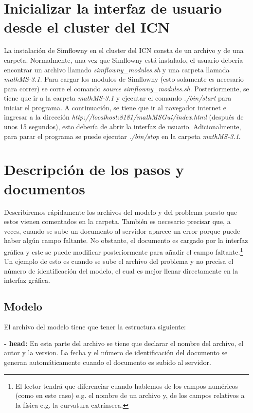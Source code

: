 \documentclass[11pt]{article}
\begin{document}
\section{Inicializar la interfaz de usuario desde el cluster del ICN}
La instalación de Simflowny en el cluster del ICN consta de un archivo y de una carpeta. Normalmente, una vez que Simflowny está instalado, el usuario debería encontrar un archivo llamado {\itshape simflowny\_modules.sh} y una carpeta llamada {\itshape mathMS-3.1}. Para cargar los modulos de Simflowny (esto solamente es necesario para correr) se corre el comando {\itshape source simflowny\_modules.sh}. Posteriormente, se tiene que ir a la carpeta {\itshape mathMS-3.1} y ejecutar el comando {\itshape ./bin/start} para iniciar el programa. A continuación, se tiene que ir al navegador internet e ingresar a la dirección {\itshape http://localhost:8181/mathMSGui/index.html} (después de unos 15 segundos), esto debería de abrir la interfaz de usuario. Adicionalmente, para parar el programa se puede ejecutar {\itshape ./bin/stop} en la carpeta {\itshape mathMS-3.1}. 

\section{Descripción de los pasos y documentos}
Describiremos rápidamente los archivos del modelo y del problema puesto que estos vienen comentados en la carpeta. También es necesario precisar que, a veces, cuando se sube un documento al servidor aparece un error porque puede haber algún campo faltante. No obstante, el documento es cargado por la interfaz gráfica y este se puede modificar posteriormente para añadir el campo faltante.\footnote{El lector tendrá que diferenciar cuando hablemos de los campos numéricos (como en este caso) e.g. el nombre de un archivo y, de los campos relativos a la física e.g. la curvatura extrínseca.} Un ejemplo de esto es cuando se sube el archivo del problema y no precisa el número de identificación del modelo, el cual es mejor llenar directamente en la interfaz gráfica.
\subsection{Modelo}
El archivo del modelo tiene que tener la estructura siguiente:

{\bf - head:}
En esta parte del archivo se tiene que declarar el nombre del archivo, el autor y la version. La fecha y el número de  identificación del documento se generan automáticamente cuando el documento es subido al servidor.
\end{document}
